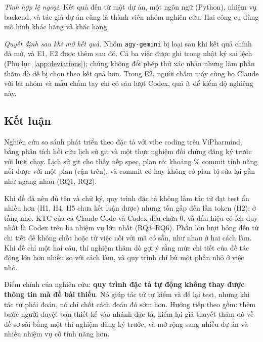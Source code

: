 \textit{Tính hợp lệ ngoại.} Kết quả đến từ một dự án, một ngôn ngữ (Python), \NumTasksMain{} nhiệm vụ backend, và
tác giả dự án cũng là thành viên nhóm nghiên cứu. Hai công cụ dùng mô hình khác hãng và khác hạng.

\textit{Quyết định sau khi mở kết quả.} Nhóm \texttt{agy-gemini} bị loại sau khi kết quả chính đã mở, và E1, E2
được thêm sau đó. Cả ba việc được ghi trong nhật ký sai lệch (Phụ lục~\ref{app:deviations}); chúng không đổi
phép thử xác nhận nhưng làm phần thăm dò dễ bị chọn theo kết quả hơn. Trong E2, người chấm máy cùng họ Claude
với ba nhóm và mẫu chấm tay chỉ có sáu lượt Codex, quá ít để kiểm độ nghiêng này.

\subsection{Kết luận}\label{sec:conclusion}

Nghiên cứu so sánh phát triển theo đặc tả với vibe coding trên ViPharmind, bằng phân tích hồi cứu lịch sử git
và một thực nghiệm đối chứng đăng ký trước với \NumResRuns{} lượt chạy. Lịch sử git cho thấy nếp spec, plan rõ:
khoảng \NumFeatWithPlanPct{}\% commit tính năng nối được với một plan (cận trên), và commit có hay không có plan
bị sửa lại gần như ngang nhau (RQ1, RQ2).

Khi đề đã nêu đủ tên và chữ ký, quy trình đặc tả không làm tác tử đạt test ẩn nhiều hơn (H1, H4, H5 chưa kết
luận được) nhưng tốn gấp \NumResTokenRatioMin{} đến \NumResTokenRatioMax{} lần token (H2); ở tầng nhỏ, KTC của cả
Claude Code và Codex đều chứa 0, và dấu hiệu có ích duy nhất là Codex trên ba nhiệm vụ lớn nhất (RQ3--RQ6). Phần lớn lượt hỏng
đến từ chi tiết đề không chốt hoặc từ việc nối với mã có sẵn, như nhau ở hai cách làm. Khi đề chỉ một hai câu,
thí nghiệm thăm dò gợi ý rằng mức chi tiết của đề tác động lớn hơn nhiều so với cách làm, và quy trình chỉ bù
một phần nhỏ ở việc nhỏ.

Điểm chính của nghiên cứu: \textbf{quy trình đặc tả tự động không thay được thông tin mà đề bài thiếu}. Nó giúp
tác tử tự kiểm và để lại test, nhưng khi tác tử phải đoán, nó chỉ chốt cách đoán đó sớm hơn. Hướng tiếp theo
gồm: thêm bước người duyệt bản thiết kế vào nhánh đặc tả, kiểm lại giả thuyết thăm dò về đề sơ sài bằng một
thí nghiệm đăng ký trước, và mở rộng sang nhiều dự án và nhiều nhiệm vụ cỡ tính năng hơn.
